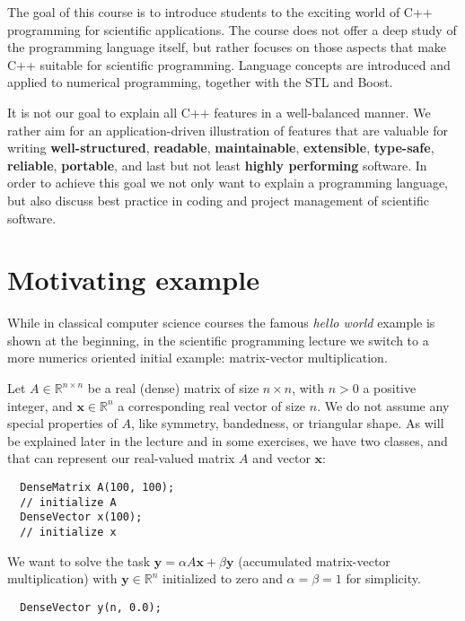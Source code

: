 The goal of this course is to introduce students to the exciting world of C++ programming for scientific applications. The course
does not offer a deep study of the programming language itself, but rather focuses on those aspects that make C++ suitable for
scientific programming. Language concepts are introduced and applied to numerical programming, together with the STL and Boost.

It is not our goal to explain all C++ features in a well-balanced manner. We rather aim for an application-driven illustration of
features that are valuable for writing \textbf{well-structured}, \textbf{readable}, \textbf{maintainable}, \textbf{extensible},
\textbf{type-safe}, \textbf{reliable}, \textbf{portable}, and last but not least \textbf{highly performing} software. In order
to achieve this goal we not only want to explain a programming language, but also discuss best practice in coding and project
management of scientific software.

\section{Motivating example}
While in classical computer science courses the famous \emph{hello world} example is shown at the beginning, in the scientific
programming lecture we switch to a more numerics oriented initial example: matrix-vector multiplication.

Let $A\in\mathbb{R}^{n\times n}$ be a real (dense) matrix of size $n\times n$, with $n > 0$ a positive integer, and $\mathbf{x}\in\mathbb{R}^n$
a corresponding real vector of size $n$. We do not assume any special properties of $A$, like symmetry, bandedness, or triangular
shape. As will be explained later in the lecture and in some exercises, we have two classes,  and 
that can represent our real-valued matrix $A$ and vector $\mathbf{x}$:
%
\begin{verbatim}
  DenseMatrix A(100, 100);
  // initialize A
  DenseVector x(100);
  // initialize x
\end{verbatim}

We want to solve the task $\mathbf{y} = \alpha A\mathbf{x} + \beta \mathbf{y}$ (accumulated matrix-vector multiplication) with $\mathbf{y}\in\mathbb{R}^n$ initialized to zero
and $\alpha=\beta=1$ for simplicity.
%
\begin{verbatim}
  DenseVector y(n, 0.0);
\end{verbatim}

